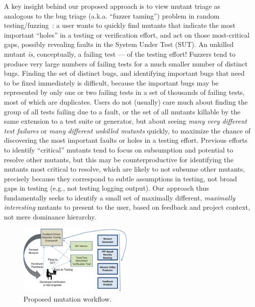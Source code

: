 A key insight behind our proposed approach is to view mutant triage as
analogous to the bug triage
(a.k.a.  ``fuzzer
taming'') problem in random testing/fuzzing~\cite{PLDI13,distMut,SemCrash,vantonder-ase18}:  a user wants
to quickly find mutants that indicate the most important ``holes'' in a testing
or verification effort, and act on those most-critical gaps, possibly revealing
faults in the System Under Test (SUT).
An unkilled mutant \emph{is}, conceptually, a failing test --- of the testing
effort!
Fuzzers tend to produce very large numbers of failing tests for a much
smaller number of distinct bugs.  Finding the set of distinct bugs,
and identifying important bugs that need to be fixed immediately is
difficult, because the important bugs may be represented by only one
or two failing tests in a set of thousands of failing tests, most of
which are duplicates.
Users do not (usually) care much
about finding the group of all tests failing due to a fault, or the
set of all mutants killable by the same extension to a test suite or
generator, but about seeing \emph{many very different test failures}
or \emph{many
  different unkilled mutants} quickly, to maximize the chance of
discovering the most important faults or holes in a testing effort.
Previous efforts to identify ``critical'' mutants tend to focus on
subsumption and potential to resolve other mutants, but this may be
counterproductive for identifying the mutants most critical to
resolve, which are likely to not subsume other mutants, precisely
because they correspond to subtle assumptions in testing, not broad
gaps in testing (e.g., not testing logging output).
Our approach thus fundamentally seeks to identify a small set of maximally different, \emph{maximally interesting} mutants to present
to the user, based on feedback and project context, not mere dominance
hierarchy.

\begin{figure}
\centering 
\includegraphics[width=0.5\textwidth]{TestFlow}

\caption{Proposed mutation workflow. }
\label{fig:flow}
\end{figure}



